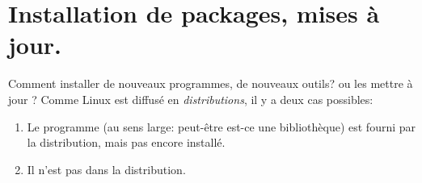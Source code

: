 \section{Installation de \og packages\fg, mises à jour.}
Comment installer de nouveaux programmes, de nouveaux outils? ou les
mettre à jour ? Comme
Linux est diffusé en \emph{distributions}, il y a deux cas possibles:
\begin{enumerate}
  \item Le programme (au sens large: peut-être est-ce une
    bibliothèque) est fourni par la distribution, mais pas encore
      installé.
    \item Il n'est pas dans la distribution.
\end{enumerate}
